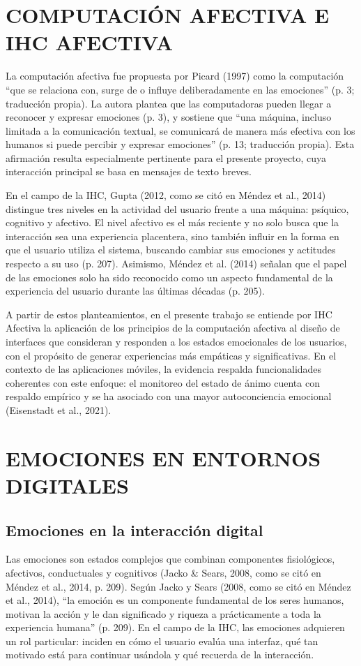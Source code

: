 \section{COMPUTACIÓN AFECTIVA E IHC AFECTIVA}
La computación afectiva fue propuesta por Picard (1997) como la computación ``que se relaciona con, surge de o influye deliberadamente en las emociones'' (p. 3; traducción propia). La autora plantea que las computadoras pueden llegar a reconocer y expresar emociones (p. 3), y sostiene que ``una máquina, incluso limitada a la comunicación textual, se comunicará de manera más efectiva con los humanos si puede percibir y expresar emociones'' (p. 13; traducción propia). Esta afirmación resulta especialmente pertinente para el presente proyecto, cuya interacción principal se basa en mensajes de texto breves.

En el campo de la IHC, Gupta (2012, como se citó en Méndez et al., 2014) distingue tres niveles en la actividad del usuario frente a una máquina: psíquico, cognitivo y afectivo. El nivel afectivo es el más reciente y no solo busca que la interacción sea una experiencia placentera, sino también influir en la forma en que el usuario utiliza el sistema, buscando cambiar sus emociones y actitudes respecto a su uso (p. 207). Asimismo, Méndez et al. (2014) señalan que el papel de las emociones solo ha sido reconocido como un aspecto fundamental de la experiencia del usuario durante las últimas décadas (p. 205).

A partir de estos planteamientos, en el presente trabajo se entiende por IHC Afectiva la aplicación de los principios de la computación afectiva al diseño de interfaces que consideran y responden a los estados emocionales de los usuarios, con el propósito de generar experiencias más empáticas y significativas. En el contexto de las aplicaciones móviles, la evidencia respalda funcionalidades coherentes con este enfoque: el monitoreo del estado de ánimo cuenta con respaldo empírico y se ha asociado con una mayor autoconciencia emocional (Eisenstadt et al., 2021).

\section{EMOCIONES EN ENTORNOS DIGITALES}

\subsection{Emociones en la interacción digital}
Las emociones son estados complejos que combinan componentes fisiológicos, afectivos, conductuales y cognitivos (Jacko \& Sears, 2008, como se citó en Méndez et al., 2014, p. 209). Según Jacko y Sears (2008, como se citó en Méndez et al., 2014), ``la emoción es un componente fundamental de los seres humanos, motivan la acción y le dan significado y riqueza a prácticamente a toda la experiencia humana'' (p. 209). En el campo de la IHC, las emociones adquieren un rol particular: inciden en cómo el usuario evalúa una interfaz, qué tan motivado está para continuar usándola y qué recuerda de la interacción.

